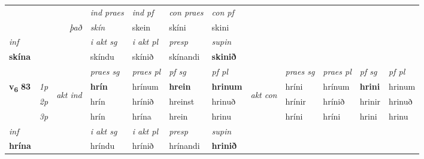 \begin{longtable}[l]{X>{\footnotesize\itshape}llXXXXlXXXX}
   && &  \textit{ind praes} & \textit{ind pf} & \textit{con praes} & \textit{con pf} \\*
\multicolumn{3}{r}{\textit{það}} & skín & skein & skíni & skini \\*

\cmidrule{4-7}
   {\textit{inf}} & &  & \textit{i akt sg} & \textit{i akt pl}   & \textit{presp} & \textit{supin}   \\*
  {\textbf{skína}} & && skíndu  & skínið   & skínandi &  \textbf{skinið}   \\*

\midrule

 & &   & \textit{praes sg}  & \textit{praes pl}    & \textit{ pf sg} & \textit{pf pl} & & \textit{praes sg}  & \textit{praes pl}    & \textit{pf sg} & \textit{pf pl }  \\ \cmidrule{4-7} \cmidrule{9-12}
 \multirow{2}{*}{{{\textbf{v{\textsubscript{6}}} \Large{\textbf{83}}}}}  & 1p & \multirow{3}{*}{\begin{turn}{90}\textit{akt ind}\end{turn}} & \textbf{hrín} & hrínum & \textbf{hrein} & \textbf{hrinum} & \multirow{3}{*}{\begin{turn}{90}\textit{akt con}\end{turn}} &hríni & hrínum & \textbf{hrini} & hrinum\\*
 & 2p &  &  hrín  & hrínið & hreinst & hrinuð & & hrínir & hrínið & hrinir & hrinuð \\*
 & 3p &  & hrín & hrína & hrein & hrinu & & hríni & hríni& hrini & hrinu \\*
\cmidrule{4-7} \cmidrule{9-12}

   {\textit{inf}} & &  & \textit{i akt sg} & \textit{i akt pl}   & \textit{presp} & \textit{supin}   \\*
  {\textbf{hrína}} & && hríndu  & hrínið   & hrínandi &  \textbf{hrinið}   \\*

\midrule


\end{longtable}
